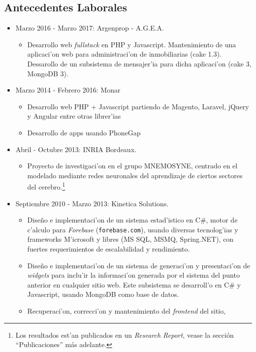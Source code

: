 \subsection*{Antecedentes Laborales}
\begin{itemize}
	\item Marzo 2016 - Marzo 2017: Argenprop - A.G.E.A.
		\begin{itemize}
			\item Desarrollo web \emph{fullstack} en PHP y Javascript.
				\subitem Mantenimiento de una aplicaci'on web para administraci'on de inmobiliarias (cake 1.3).
				\subitem Dessarollo de un subsistema de mensajer'ia para dicha aplicaci'on (cake 3, MongoDB 3).
	\end{itemize}
	\item Marzo 2014 - Febrero 2016: Monar
		\begin{itemize}
			\item Desarrollo web PHP + Javascript partiendo de Magento, Laravel, jQuery y Angular
				entre otras librer'ias
			\item Desarrollo de apps usando PhoneGap
		\end{itemize}
	\item Abril - Octubre 2013: INRIA Bordeaux.
		\begin{itemize}
			\item Proyecto de investigaci'on en el grupo MNEMOSYNE, centrado en el modelado mediante
				redes neuronales del aprendizaje de ciertos sectores del cerebro.\footnote[1]{Los
					resultados est'an publicados en un \emph{Research Report}, vease la sección
					``Publicaciones'' más adelante.}
		\end{itemize}
	\item Septiembre 2010 - Marzo 2013: Kinetica Solutions.
		\begin{itemize}
			\item Dise\~no e implementaci'on de un sistema estad'istico en C\#,
				motor de c'alculo para \emph{Forebase} (\texttt{forebase.com}), usando
				diversas tecnolog'ias y frameworks M'icrosoft y libres (MS SQL, MSMQ,
				Spring.NET), con fuertes requerimientos de escalabilidad y rendimiento.
			\item Dise\~no e implementaci'on de un sistema de generaci'on y presentaci'on
				de \emph{widgets} para inclu'ir la informaci'on generada por el sistema del
				punto anterior en cualquier sitio web.  Este subsistema se desarroll'o en C\# y
				Javascript, usando MongoDB como base de datos.
			\item Recuperaci'on, correcci'on y mantenimiento del \emph{frontend} del sitio,

\end{itemize}
\end{itemize}
